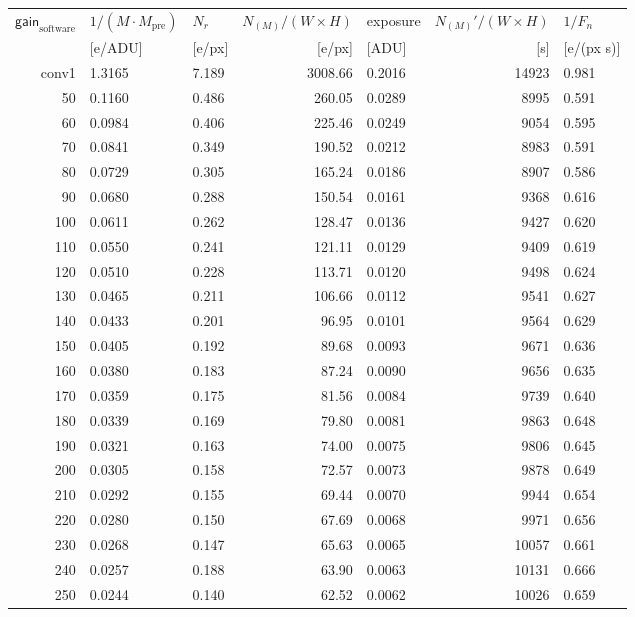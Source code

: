 \begin{table}[!htbp]
  \centering
  \begin{tabular}{r l l r  l r l}
\toprule
$\textsf{gain}_\textrm{software}$ & $1/(M\cdot M_\textrm{pre})$ & $N_r$ & $N_{(M)}/(W\times H)$ &  \textsf{exposure} & $N_{(M)}'/(W\times H)$ & $1/F_n$ \\
 & [e/ADU] & [e/px] & [e/px] & [ADU] & [s] & [e/(px s)]  \\
\midrule
conv1 & 1.3165 & 7.189 & 3008.66      & 0.2016 & 14923 & 0.981 \\
50 & 0.1160 & 0.486 & 260.05 & 0.0289 & 8995 & 0.591 \\
60 & 0.0984 & 0.406 & 225.46 & 0.0249 & 9054 & 0.595 \\
70 & 0.0841 & 0.349 & 190.52 & 0.0212 & 8983 & 0.591 \\
80 & 0.0729 & 0.305 & 165.24 & 0.0186 & 8907 & 0.586 \\
90 & 0.0680 & 0.288 & 150.54 & 0.0161 & 9368 & 0.616 \\
100 & 0.0611 & 0.262 & 128.47 & 0.0136 & 9427 & 0.620 \\
110 & 0.0550 & 0.241 & 121.11 & 0.0129 & 9409 & 0.619 \\
120 & 0.0510 & 0.228 & 113.71 & 0.0120 & 9498 & 0.624 \\
130 & 0.0465 & 0.211 & 106.66 & 0.0112 & 9541 & 0.627 \\
140 & 0.0433 & 0.201 & 96.95 & 0.0101 & 9564 & 0.629 \\
150 & 0.0405 & 0.192 & 89.68 & 0.0093 & 9671 & 0.636 \\
160 & 0.0380 & 0.183 & 87.24 & 0.0090 & 9656 & 0.635 \\
170 & 0.0359 & 0.175 & 81.56 & 0.0084 & 9739 & 0.640 \\
180 & 0.0339 & 0.169 & 79.80 & 0.0081 & 9863 & 0.648 \\
190 & 0.0321 & 0.163 & 74.00 & 0.0075 & 9806 & 0.645 \\
200 & 0.0305 & 0.158 & 72.57 & 0.0073 & 9878 & 0.649 \\
210 & 0.0292 & 0.155 & 69.44 & 0.0070 & 9944 & 0.654 \\
220 & 0.0280 & 0.150 & 67.69 & 0.0068 & 9971 & 0.656 \\
230 & 0.0268 & 0.147 & 65.63 & 0.0065 & 10057 & 0.661 \\
240 & 0.0257 & 0.188 & 63.90 & 0.0063 & 10131 & 0.666 \\
250 & 0.0244 & 0.140 & 62.52 & 0.0062 & 10026 & 0.659 \\

\end{tabular}
\end{table}
